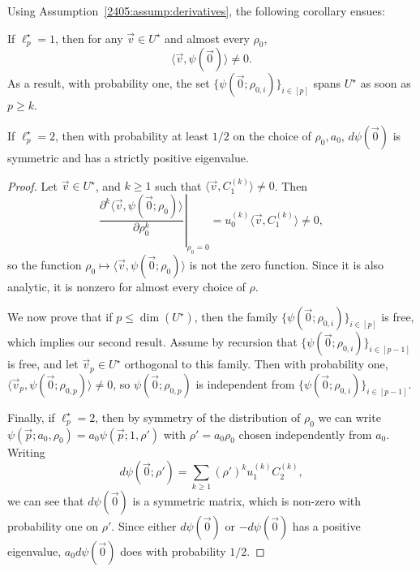 Using Assumption~\ref{2405:assump:derivatives}, the following corollary ensues:
\begin{corollary}
    If $\ell_p^\star = 1$, then for any $\vec{v}\in U^\star$ and almost every $\rho_0$,
    \[ \langle \vec{v}, \psi(\vec{0}) \rangle \neq 0. \]
    As a result, with probability one, the set $\{ \psi(\vec{0}; \rho_{0, i}) \}_{i \in [p]}$ spans $U^\star$ as soon as $p \geq k$.
    
    If $\ell_p^\star = 2$, then with probability at least $1/2$ on the choice of $\rho_0, a_0$, $d\psi(\vec{0})$ is symmetric and has a strictly positive eigenvalue.
\end{corollary}

\begin{proof}
    Let $\vec{v}\in U^\star$, and $k \geq 1$ such that $\langle \vec{v}, C_1^{(k)} \rangle \neq 0$. Then 
    \[\left.\frac{\partial^k \langle \vec{v}, \psi(\vec{0}; \rho_0) \rangle}{\partial \rho_0^k}\right|_{\rho_0 = 0} = u_0^{(k)} \langle \vec{v}, C_1^{(k)} \rangle \neq 0, \]
    so the function $\rho_0 \mapsto \langle \vec{v}, \psi(\vec{0}; \rho_0) \rangle$ is not the zero function. Since it is also analytic, it is nonzero for almost every choice of $\rho$.
    
    We now prove that if $p \leq \dim(U^\star)$, then the family $\{ \psi(\vec{0}; \rho_{0, i}) \}_{i \in [p]}$ is free, which implies our second result. Assume by recursion that $\{ \psi(\vec{0}; \rho_{0, i}) \}_{i \in [p-1]}$ is free, and let $\vec{v}_p \in U^\star$ orthogonal to this family. Then with probability one, $\langle \vec{v}_p, \psi(\vec{0}; \rho_{0, p}) \rangle \neq 0$, so $\psi(\vec{0}; \rho_{0, p})$ is independent from $\{ \psi(\vec{0}; \rho_{0, i}) \}_{i \in [p-1]}$.

    Finally, if $\ell_p^\star = 2$, then by symmetry of the distribution of $\rho_0$ we can write $\psi(\vec{p}; a_0, \rho_0) = a_0 \psi(\vec{p}; 1, \rho')$ with $\rho' = a_0 \rho_0$ chosen independently from $a_0$. Writing
    \[ d\psi(\vec{0}; \rho') = \sum_{k \geq 1} (\rho')^k u_1^{(k)} C_2^{(k)}, \]
    we can see that $d\psi(\vec{0})$ is a symmetric matrix, which is non-zero with probability one on $\rho'$. Since either $d\psi(\vec{0})$ or $-d\psi(\vec{0})$ has a positive eigenvalue, $a_0d\psi(\vec{0})$ does with probability $1/2$.
\end{proof}


